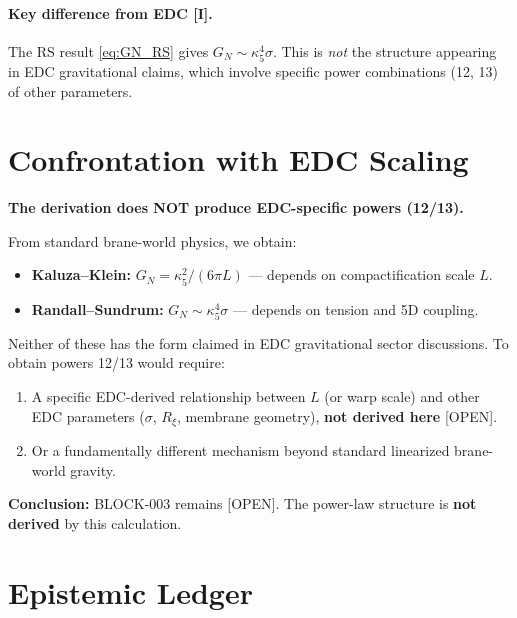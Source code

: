 \documentclass[11pt,a4paper]{article}
\newcommand{\tagI}{\textcolor{green!50!black}{[I]}}
\newcommand{\tagOPEN}{\textcolor{red!70!black}{[OPEN]}}
\begin{document}
\paragraph{Key difference from EDC \tagI{}.}
The RS result \eqref{eq:GN_RS} gives $G_N \sim \kappa_5^4 \sigma$.
This is \emph{not} the structure appearing in EDC gravitational claims, which involve specific power combinations (12, 13) of other parameters.

\section{Confrontation with EDC Scaling}
\label{sec:edc_scaling}

\begin{failbox}
\textbf{The derivation does NOT produce EDC-specific powers (12/13).}

From standard brane-world physics, we obtain:
\begin{itemize}[nosep]
    \item \textbf{Kaluza--Klein:} $G_N = \kappa_5^2 / (6\pi L)$ — depends on compactification scale $L$.
    \item \textbf{Randall--Sundrum:} $G_N \sim \kappa_5^4 \sigma$ — depends on tension and 5D coupling.
\end{itemize}

Neither of these has the form claimed in EDC gravitational sector discussions.
To obtain powers 12/13 would require:
\begin{enumerate}
    \item A specific EDC-derived relationship between $L$ (or warp scale) and other EDC parameters ($\sigma$, $R_\xi$, membrane geometry), \textbf{not derived here} \tagOPEN{}.
    \item Or a fundamentally different mechanism beyond standard linearized brane-world gravity.
\end{enumerate}

\textbf{Conclusion:} BLOCK-003 remains \tagOPEN{}. The power-law structure is \textbf{not derived} by this calculation.
\end{failbox}

\section{Epistemic Ledger}
\label{sec:ledger}
\end{document}
